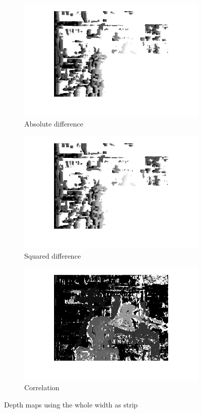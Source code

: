 \documentclass{article}
\begin{document}
\begin{figure}[ht!]
 \centering
 \begin{subfigure}{.49\textwidth}
  \centering
  \includegraphics[width=\linewidth]{abs_dev15.png}
  \caption{Absolute difference}
  \label{fig1a}
 \end{subfigure}
 \begin{subfigure}{.49\textwidth}
  \centering
  \includegraphics[width=\linewidth]{squared_dev15.png}
  \caption{Squared difference}
  \label{fig1b}
 \end{subfigure}
 \begin{subfigure}{.49\textwidth}
  \centering
  \includegraphics[width=1\linewidth]{corr_dev15.png}
  \caption{Correlation}
  \label{fig1c}
 \end{subfigure}
 \caption{Depth maps using the whole width as strip}
 \label{fig1}
\end{figure}
\end{document}
